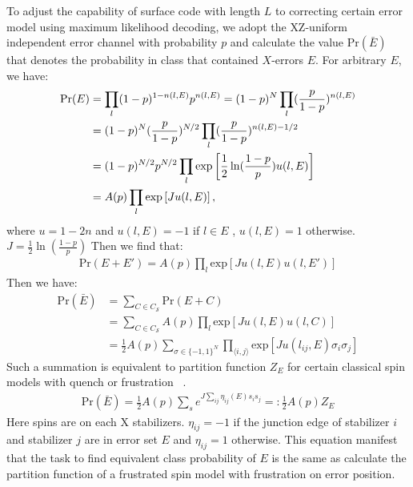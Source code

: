 \documentclass[11pt]{article}
\begin{document}
To adjust the capability of surface code with length $L$ to correcting certain error model using maximum likelihood decoding, we adopt the $\text{XZ-}$uniform independent error channel with probability $p$ and calculate the value $\text{Pr}(\bar E)$ that denotes the probability in class that contained $X$-errors $E$. For arbitrary $E$, we have:
\begin{align}
    \text{Pr}({E}) &= \prod_l (1 - p)^{1 - n(l,E)} p^{n(l,E)} = (1 - p)^{N}\prod_l  (\frac{p}{1 - p})^{n(l,E)} \notag \\
    &=(1 - p)^{N} (\frac{p}{1 - p})^{N/2}\prod_l   (\frac{p}{1 - p})^{n(l,E) - 1/2}\\
    &=(1 - p)^{N/2} p^{N/2}\prod_l  \text{exp}\left[{\frac{1}{2}\ln (\frac{1-p}{p}) u(l,E)}\right] \\
    &=A(p)\prod_l  \text{exp}\left[{J u(l,E)}\right],
\end{align}
where $u= 1 -2n$ and $u(l,E) = -1$ if $l \in E$ , $u(l,E) = 1$ otherwise. $J = \frac{1}{2}\ln (\frac{1-p}{p})$ Then we find that:
\begin{align}
    \text{Pr}(E +E') = A(p)\prod_l  \text{exp}\left[{J u(l,E)u(l,E')}\right]
\end{align}
Then we have:
\begin{align}
    \text{Pr}(\bar E) &=  \sum_{C \in C_{\mathcal{S}}} \text{Pr}(E + C) \\
    & = \sum_{C \in C_{\mathcal{S}}} A(p)\prod_l  \text{exp}\left[{J u(l,E)u(l,C)}\right]\\
    &=\frac{1}{2}A(p)\sum_{\sigma \in \{-1,1\}^N}\prod_{\langle i,j\rangle}  \text{exp}\left[{J u(l_{ij},E) \sigma_i \sigma_j}\right]
\end{align}
Such a summation is equivalent to partition function $Z_E$ for certain classical spin models with quench or frustration ~\cite{Chubb_2021}.
\begin{align}
   \text{Pr}(\bar{E}) =\frac{1}{2}A(p)\sum_{s} e^{J\sum_{i j} \eta_{ij}(E) s_i s_j} =: \frac{1}{2}A(p)Z_E
   \label{eq:equi_proba_to_partition}
\end{align}
Here spins are on each $\text{X}$ stabilizers. $\eta_{ij} = -1$ if the junction edge of stabilizer $i$ and stabilizer $j$ are in error set $E$ and $\eta_{ij} = 1$ otherwise. This equation manifest that the task to find equivalent class probability of $E$ is the same as calculate the partition function of a frustrated spin model with frustration on error position. 
\end{document}
